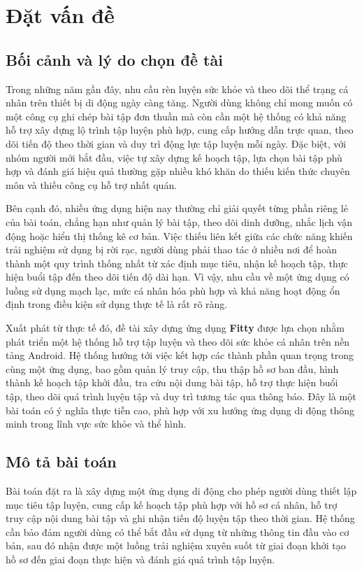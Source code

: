 \chapter{Đặt vấn đề}

\section{Bối cảnh và lý do chọn đề tài}

Trong những năm gần đây, nhu cầu rèn luyện sức khỏe và theo dõi thể trạng cá nhân trên thiết bị di động ngày càng tăng. Người dùng không chỉ mong muốn có một công cụ ghi chép bài tập đơn thuần mà còn cần một hệ thống có khả năng hỗ trợ xây dựng lộ trình tập luyện phù hợp, cung cấp hướng dẫn trực quan, theo dõi tiến độ theo thời gian và duy trì động lực tập luyện mỗi ngày. Đặc biệt, với nhóm người mới bắt đầu, việc tự xây dựng kế hoạch tập, lựa chọn bài tập phù hợp và đánh giá hiệu quả thường gặp nhiều khó khăn do thiếu kiến thức chuyên môn và thiếu công cụ hỗ trợ nhất quán.

Bên cạnh đó, nhiều ứng dụng hiện nay thường chỉ giải quyết từng phần riêng lẻ của bài toán, chẳng hạn như quản lý bài tập, theo dõi dinh dưỡng, nhắc lịch vận động hoặc hiển thị thống kê cơ bản. Việc thiếu liên kết giữa các chức năng khiến trải nghiệm sử dụng bị rời rạc, người dùng phải thao tác ở nhiều nơi để hoàn thành một quy trình thống nhất từ xác định mục tiêu, nhận kế hoạch tập, thực hiện buổi tập đến theo dõi tiến độ dài hạn. Vì vậy, nhu cầu về một ứng dụng có luồng sử dụng mạch lạc, mức cá nhân hóa phù hợp và khả năng hoạt động ổn định trong điều kiện sử dụng thực tế là rất rõ ràng.

Xuất phát từ thực tế đó, đề tài xây dựng ứng dụng \textbf{Fitty} được lựa chọn nhằm phát triển một hệ thống hỗ trợ tập luyện và theo dõi sức khỏe cá nhân trên nền tảng Android. Hệ thống hướng tới việc kết hợp các thành phần quan trọng trong cùng một ứng dụng, bao gồm quản lý truy cập, thu thập hồ sơ ban đầu, hình thành kế hoạch tập khởi đầu, tra cứu nội dung bài tập, hỗ trợ thực hiện buổi tập, theo dõi quá trình luyện tập và duy trì tương tác qua thông báo. Đây là một bài toán có ý nghĩa thực tiễn cao, phù hợp với xu hướng ứng dụng di động thông minh trong lĩnh vực sức khỏe và thể hình.

\section{Mô tả bài toán}

Bài toán đặt ra là xây dựng một ứng dụng di động cho phép người dùng thiết lập mục tiêu tập luyện, cung cấp kế hoạch tập phù hợp với hồ sơ cá nhân, hỗ trợ truy cập nội dung bài tập và ghi nhận tiến độ luyện tập theo thời gian. Hệ thống cần bảo đảm người dùng có thể bắt đầu sử dụng từ những thông tin đầu vào cơ bản, sau đó nhận được một luồng trải nghiệm xuyên suốt từ giai đoạn khởi tạo hồ sơ đến giai đoạn thực hiện và đánh giá quá trình tập luyện.

